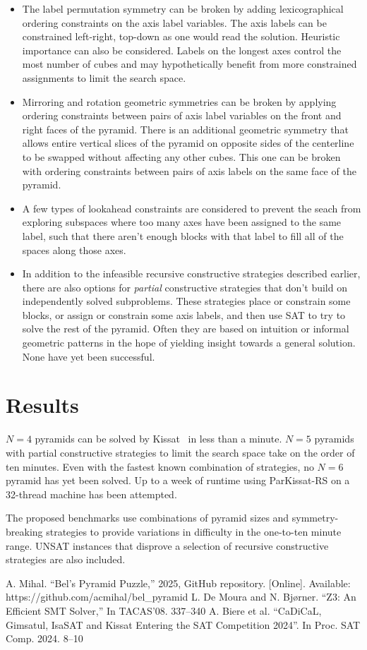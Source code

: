 \documentclass[conference]{IEEEtran}
\begin{document}
\begin{itemize}
\item The label permutation symmetry can be broken by adding lexicographical ordering constraints on the axis label variables.
The axis labels can be constrained left-right, top-down as one would read the solution.
Heuristic importance can also be considered.
Labels on the longest axes control the most number of cubes and may hypothetically benefit from more constrained assignments to limit the search space.
\item Mirroring and rotation geometric symmetries can be broken by applying ordering constraints between pairs of axis label
variables on the front and right faces of the pyramid.
There is an additional geometric symmetry that allows entire vertical slices of the pyramid on opposite sides of the centerline to be
swapped without affecting any other cubes.
This one can be broken with ordering constraints between pairs of axis labels on the same face of the pyramid.
\item A few types of lookahead constraints are considered to prevent the seach from exploring subspaces where too many axes have been
assigned to the same label, such that there aren't enough blocks with that label to fill all of the spaces along those axes.
\item In addition to the infeasible recursive constructive strategies described earlier, there are also options for \emph{partial} constructive strategies
that don't build on independently solved subproblems.
These strategies place or constrain some blocks, or assign or constrain some axis labels, and then use SAT to try to solve the rest of the pyramid.
Often they are based on intuition or informal geometric patterns in the hope of yielding insight towards a general solution.
None have yet been successful.
\end{itemize}

\section{Results}

$N=4$ pyramids can be solved by Kissat~\cite{k1} in less than a minute.
$N=5$ pyramids with partial constructive strategies to limit the search space take on the order of ten minutes.
Even with the fastest known combination of strategies, no $N=6$ pyramid has yet been solved.
Up to a week of runtime using ParKissat-RS on a 32-thread machine has been attempted.

The proposed benchmarks use combinations of pyramid sizes and symmetry-breaking strategies to provide variations in difficulty in the one-to-ten minute range.
UNSAT instances that disprove a selection of recursive constructive strategies are also included.

\begin{thebibliography}{0}
 A. Mihal. ``Bel's Pyramid Puzzle,'' 2025, GitHub repository. [Online]. Available: https://github.com/acmihal/bel\_pyramid
 L. De Moura and N. Bj{\o}rner. ``Z3: An Efficient SMT Solver,'' In TACAS'08. 337--340
 A. Biere et al. ``CaDiCaL, Gimsatul, IsaSAT and Kissat Entering the SAT Competition 2024''. In Proc. SAT Comp. 2024. 8--10
\end{thebibliography}
\end{document}
